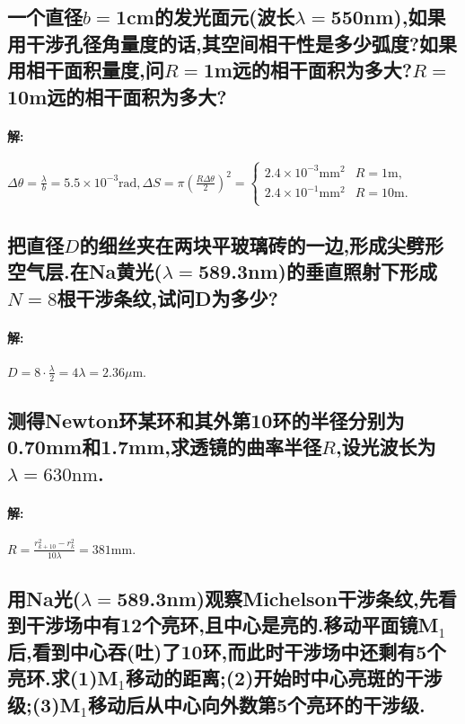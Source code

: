 \documentclass[UTF8]{article}
\newcommand{\m}{\mathrm{m}}
\newcommand{\mm}{\mathrm{mm}}
\newcommand{\nm}{\mathrm{nm}}
\begin{document}
    \subsection{一个直径$b=$1cm的发光面元(波长$\lambda=$550nm),如果用干涉孔径角量度的话,其空间相干性是多少弧度?如果用相干面积量度,问$R=$1m远的相干面积为多大?$R=$10m远的相干面积为多大?
    } %
    \paragraph{解: }$\Delta \theta=\frac{\lambda}{b}=5.5\times 10^{-3}\mathrm{rad},\Delta S=\pi\left( \frac{R\Delta \theta}{2} \right)^2=\left\{ \begin{array}{ll}
        2.4\times 10^{-3} \mm^2&R=1\m,\\ 2.4\times 10^{-1} \mm^2&R=10\m.\\
    \end{array} \right.$

    \subsection{把直径$D$的细丝夹在两块平玻璃砖的一边,形成尖劈形空气层.在Na黄光($\lambda=$589.3nm)的垂直照射下形成$N=8$根干涉条纹,试问D为多少?
    } %
    \paragraph{解: }$D=8\cdot\frac{\lambda}{2}=4\lambda=2.36\mu \m$.

    \setcounter{subsection}{16}
    \subsection{测得Newton环某环和其外第10环的半径分别为0.70mm和1.7mm,求透镜的曲率半径$R$,设光波长为$\lambda=630\nm$.
    } %
    \paragraph{解: }$R=\frac{r^2_{k+10}-r^2_k}{10\lambda}=381\mm$.

    \setcounter{subsection}{22}
    \subsection{用Na光($\lambda=$589.3nm)观察Michelson干涉条纹,先看到干涉场中有12个亮环,且中心是亮的.移动平面镜M$_1$后,看到中心吞(吐)了10环,而此时干涉场中还剩有5个亮环.求(1)M$_1$移动的距离;(2)开始时中心亮斑的干涉级;(3)M$_1$移动后从中心向外数第5个亮环的干涉级.} %
\end{document}
